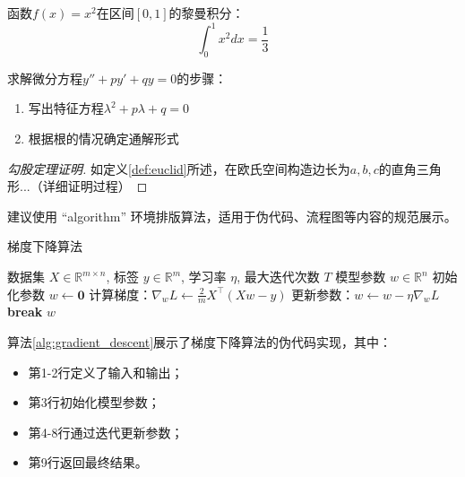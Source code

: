 \documentclass{JYU} %
\begin{document}
\begin{example}[黎曼积分]\label{ex:riemann}
	函数$f(x)=x^2$在区间$[0,1]$的黎曼积分：
	\begin{equation}
		\int_0^1 x^2 dx = \frac{1}{3}
	\end{equation}
\end{example}

\begin{solution}[特征方程法]\label{sol:characteristic}
	求解微分方程$y''+py'+qy=0$的步骤：
	\begin{enumerate}
		\item 写出特征方程$\lambda^2+p\lambda+q=0$
		\item 根据根的情况确定通解形式
	\end{enumerate}
\end{solution}

\begin{proof}[勾股定理证明]
	如定义\ref{def:euclid}所述，在欧氏空间构造边长为$a,b,c$的直角三角形...（详细证明过程）
\end{proof}


建议使用 “algorithm” 环境排版算法，适用于伪代码、流程图等内容的规范展示。

\begin{algorithm}[!htbp]
	\caption{梯度下降算法}\label{alg:gradient_descent}
	\begin{algorithmic}[1]
		\REQUIRE 数据集 $X \in \mathbb{R}^{m \times n}$, 标签 $y \in \mathbb{R}^m$, 学习率 $\eta$, 最大迭代次数 $T$
		\ENSURE 模型参数 $w \in \mathbb{R}^n$
		\STATE 初始化参数 $w \gets \mathbf{0}$
		\STATE 计算梯度：$\nabla_w L \gets \frac{2}{m} X^\top (Xw - y)$
		\STATE 更新参数：$w \gets w - \eta \nabla_w L$
		\STATE \textbf{break} 
		\ENDIF
		\ENDFOR
		\RETURN $w$
	\end{algorithmic}
\end{algorithm}


算法\ref{alg:gradient_descent}展示了梯度下降算法的伪代码实现，其中：
\begin{itemize}
	\item 第1-2行定义了输入和输出；
	\item 第3行初始化模型参数；
	\item 第4-8行通过迭代更新参数；
	\item 第9行返回最终结果。
\end{itemize}
\end{document}
